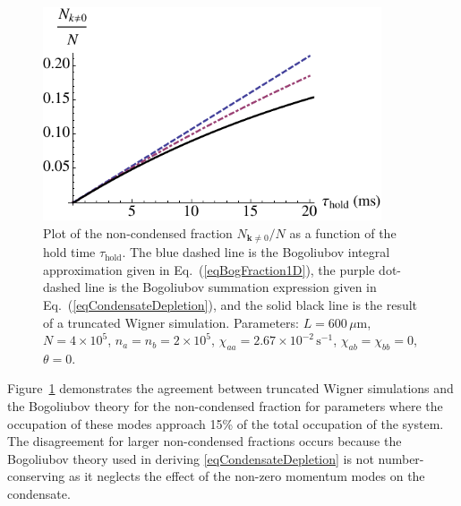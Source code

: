 \documentclass{iopart}
\begin{document}
\begin{figure}
    \centering
    \includegraphics[width=10cm]{figures/Bog_validation}
\caption{Plot of the non-condensed fraction $N_{\mathbf{k}\neq0}/N$ as a function of the hold time $\tau_\text{hold}$.  The blue dashed line is the Bogoliubov integral approximation given in Eq.~(\ref{eqBogFraction1D}), the purple dot-dashed line is the Bogoliubov summation expression given in Eq.~(\ref{eqCondensateDepletion}), and the solid black line is the result of a truncated Wigner simulation.  Parameters: $L=600\,\mu\text{m}$, $N=4 \times 10^5$, $n_a=n_b=2\times 10^5$, $\chi_{aa} = 2.67 \times 10^{-2}\, \text{s}^{-1}$, $\chi_{ab}=\chi_{bb}=0$, $\theta=0$.}
  \label{figBogSqueezingValidation}
\end{figure}


Figure~\ref{figBogSqueezingValidation} demonstrates the agreement between truncated Wigner simulations and the Bogoliubov theory for the non-condensed fraction for parameters where the occupation of these modes approach 15\% of the total occupation of the system.  The disagreement for larger non-condensed fractions occurs because the Bogoliubov theory used in deriving \eqref{eqCondensateDepletion} is not number-conserving as it neglects the effect of the non-zero momentum modes on the condensate.  
\end{document}
